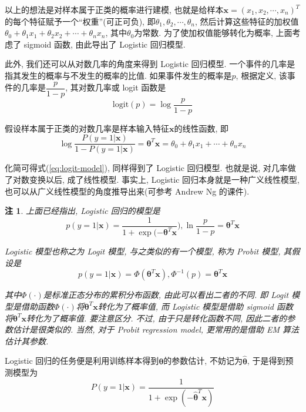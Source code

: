 \documentclass[a4paper,UTF8]{ctexart}
\theoremstyle{plain} \newtheorem{theorem}{定理}[section]
\theoremstyle{plain} \newtheorem{definition}{定义}[section]
\theoremstyle{plain} \newtheorem{lemma}{引理}[section]
\theoremstyle{plain} \newtheorem{proposition}{命题}[section]
\theoremstyle{plain} \newtheorem{example}{例}[section]
\theoremstyle{plain} \newtheorem{remark}{注}[section]
\theoremstyle{plain} \newtheorem{corollary}{推论}[section]
\begin{document}
以上的想法是对样本属于正类的概率进行建模, 也就是给样本$\bm{x} = (x_1, x_2, \cdots, x_n)^{T}$的每个特征赋予一个“权重”(可正可负), 即$\theta_1, \theta_2, \cdots, \theta_n$, 然后计算这些特征的加权值$\theta_0 + \theta_1 x_1 + \theta_2 x_2 + \cdots + \theta_n x_n$, 其中$\theta_0$为常数. 为了使加权值能够转化为概率, 上面考虑了 sigmoid 函数, 由此导出了 Logistic 回归模型.

此外, 我们还可以从对数几率的角度来得到 Logistic 回归模型. 一个事件的几率是指其发生的概率与不发生的概率的比值. 如果事件发生的概率是$p$, 根据定义, 该事件的几率是$\dfrac{p}{1 - p}$, 其对数几率或 logit 函数是
\begin{equation}
\mathrm{logit}(p) = \log \frac{p}{1 - p}
\end{equation}

假设样本属于正类的对数几率是样本输入特征$\bm{x}$的线性函数, 即
\begin{equation}
\log \frac{P(y = 1 | \bm{x})}{1 - P(y = 1 | \bm{x})} = \bm{\theta}^{T} \bm{x} = \theta_0 + \theta_1 x_ 1 + \cdots + \theta_n x_n
\end{equation}

化简可得式(\ref{eq:logit-model}), 同样得到了 Logistic 回归模型. 也就是说, 对几率做了对数变换以后, 成了线性模型. 事实上, Logistic 回归本身就是一种广义线性模型, 也可以从广义线性模型的角度推导出来(可参考 Andrew Ng 的课件).

\begin{remark}
上面已经指出, Logistic 回归的模型是
\begin{equation*}
p(y = 1 | \bm{x}) = \frac{1}{1 + \exp(- \bm{\theta}^T \bm{x}}), \ln \frac{p}{1 - p} = \bm{\theta}^T \bm{x}
\end{equation*}

Logistic 模型也称之为 Logit 模型, 与之类似的有一个模型, 称为 Probit 模型, 其假设是
\begin{equation*}
p(y = 1 | \bm{x}) = \Phi (\bm{\theta}^T \bm{x}), \Phi^{-1}(p) = \bm{\theta}^T \bm{x}
\end{equation*}

其中$\Phi(\cdot)$是标准正态分布的累积分布函数, 由此可以看出二者的不同. 即 Logit 模型是借助函数$\Phi(\cdot)$将$\bm{\theta}^T \bm{x}$转化为了概率值, 而 Logistic 模型是借助 sigmoid 函数将$\bm{\theta}^T \bm{x}$转化为了概率值. 要注意区分. 不过, 由于只是转化函数不同, 因此二者的参数估计是很类似的. 当然, 对于 Probit regression model, 更常用的是借助 EM 算法估计其参数.

\end{remark}

Logistic 回归的任务便是利用训练样本得到$\bm{\theta}$的参数估计, 不妨记为$\hat{\bm{\theta}}$, 于是得到预测模型为
\begin{equation*}
P(y = 1 | \bm{x}) = \frac{1}{1 + \exp (- \hat{\bm{\theta}}^{T} \bm{x})}
\end{equation*}
\end{document}

